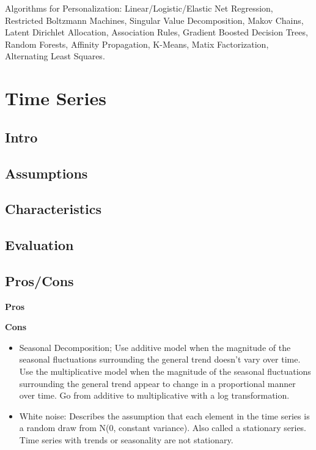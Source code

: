 \documentclass[]{book}
\theoremstyle{definition}
\theoremstyle{definition}
\theoremstyle{definition}
\theoremstyle{remark}
\begin{document}
Algorithms for Personalization: Linear/Logistic/Elastic Net Regression,
Restricted Boltzmann Machines, Singular Value Decomposition, Makov
Chains, Latent Dirichlet Allocation, Association Rules, Gradient Boosted
Decision Trees, Random Forests, Affinity Propagation, K-Means, Matix
Factorization, Alternating Least Squares.

\section{Time Series}\label{time-series}

\subsection{Intro}\label{intro-14}

\subsection{Assumptions}\label{assumptions-14}

\subsection{Characteristics}\label{characteristics-9}

\subsection{Evaluation}\label{evaluation-13}

\subsection{Pros/Cons}\label{proscons-14}

\textbf{Pros}

\textbf{Cons}

\begin{itemize}
\item
  Seasonal Decomposition; Use additive model when the magnitude of the
  seasonal fluctuations surrounding the general trend doesn't vary over
  time. Use the multiplicative model when the magnitude of the seasonal
  fluctuations surrounding the general trend appear to change in a
  proportional manner over time. Go from additive to multiplicative with
  a log transformation.
\item
  White noise: Describes the assumption that each element in the time
  series is a random draw from N(0, constant variance). Also called a
  stationary series. Time series with trends or seasonality are not
  stationary.
\end{itemize}
\end{document}
